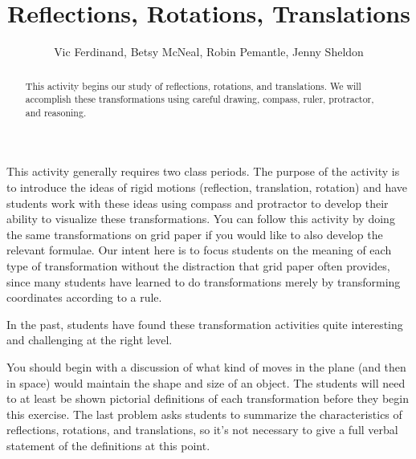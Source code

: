 \documentclass[handout]{ximera}
\title{Reflections, Rotations, Translations}
\author{Vic Ferdinand, Betsy McNeal, Robin Pemantle, Jenny Sheldon}
\begin{document}
\begin{abstract}This activity begins our study of reflections, rotations, and translations.  We will accomplish these transformations using careful drawing, compass, ruler, protractor, and reasoning.
\end{abstract}
\maketitle

\begin{instructorIntro}
This activity generally requires two class periods.  The purpose of the activity is to  introduce the ideas of rigid motions (reflection, translation, rotation) and have students work with these ideas using compass and protractor to develop their ability to visualize these transformations.  You can follow this activity by doing the same transformations on grid paper if you would like to also develop the relevant formulae.  Our intent here is to focus students on the meaning of each type of transformation without the distraction that grid paper often provides, since many students have learned to do transformations merely by transforming coordinates according to a rule.

In the past, students have found these transformation activities quite interesting and challenging at the right level.

You should begin with a discussion of what kind of moves in the plane (and then in space) would maintain the shape and size of an object. The students will need to at least be shown pictorial definitions of each transformation before they begin this exercise.  The last problem asks students to summarize the characteristics of reflections, rotations, and translations, so it's not necessary to give a full verbal statement of the definitions at this point.  


\end{instructorIntro}
\end{document}
